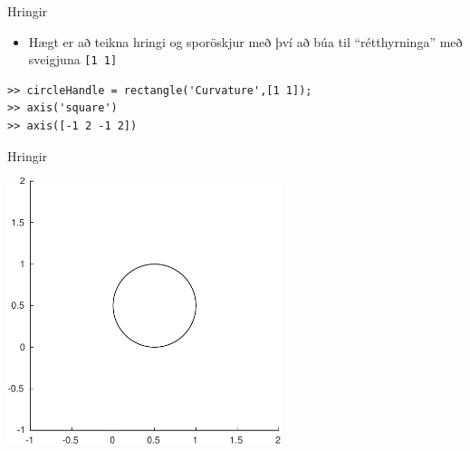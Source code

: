 \documentclass[handout]{beamer}
\begin{document}
\begin{frame}[fragile]{Hringir}
\pause
\begin{itemize}
 \item Hægt er að teikna hringi og sporöskjur með því að búa til ``rétthyrninga'' með sveigjuna \texttt{[1 1]}
\end{itemize}
\begin{verbatim}
>> circleHandle = rectangle('Curvature',[1 1]);
>> axis('square')
>> axis([-1 2 -1 2])
\end{verbatim}
\end{frame}

\begin{frame}{Hringir}
\begin{center}
\includegraphics[width=0.6\textwidth]{../Pics/circle-example}
\end{center}
\end{frame}
\end{document}
